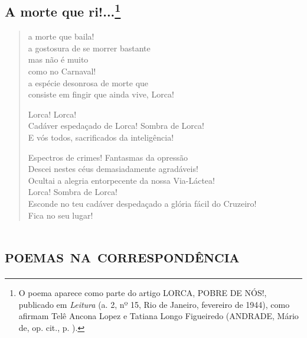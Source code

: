 \chapter{A morte que ri!...\footnote[*]{O poema aparece como parte do artigo LORCA,
  POBRE DE NÓS!, publicado em \emph{Leitura} (a. 2, nº 15, Rio de
  Janeiro, fevereiro de 1944), como afirmam Telê Ancona Lopez e Tatiana
  Longo Figueiredo (ANDRADE, Mário de, op. cit., p. ).}}

\begin{verse}
a morte que baila!\\
a gostosura de se morrer bastante\\
mas não é muito\\
como no Carnaval!\\
a espécie desonrosa de morte que\\
consiste em fingir que ainda vive, Lorca!

Lorca! Lorca!\\
Cadáver espedaçado de Lorca! Sombra de Lorca!\\
E vós todos, sacrificados da inteligência!

Espectros de crimes! Fantasmas da opressão\\
Descei nestes céus demasiadamente agradáveis!\\
Ocultai a alegria entorpecente da nossa Via-Láctea!\\
Lorca! Sombra de Lorca!\\
Esconde no teu cadáver despedaçado a glória fácil do Cruzeiro!\\
Fica no seu lugar!
\end{verse}

\part{\textsc{poemas na correspondência}}



